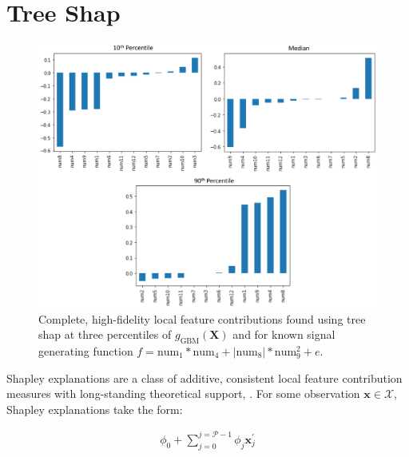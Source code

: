 \documentclass[11pt]{asaproc}
\begin{document}
\section{Tree Shap} \label{sec:shap}

\begin{figure}[htb]
	\begin{center}
		\includegraphics[scale=0.6]{img/figure_6.eps}
		\caption{Complete, high-fidelity local feature contributions found using tree shap at three percentiles of $g_{\text{GBM}}(\mathbf{X})$ and for known signal generating function $f = \text{num} _1 * \text{num}_4 + |\text{num}_8| * \text{num}_9^2 + e$.}
		\label{fig:pdp_ice}
	\end{center}
\end{figure}

Shapley explanations are a class of additive, consistent local feature contribution measures with long-standing theoretical support, \cite{shapley}. For some observation $\mathbf{x} \in \mathcal{X}$, Shapley explanations take the form:

\vspace{-5pt}

\begin{equation}
\begin{aligned}
\phi_0 + \sum_{j=0}^{j=\mathcal{P} - 1} \phi_j \mathbf{x}_j^\prime
\end{aligned}
\end{equation}
\end{document}
